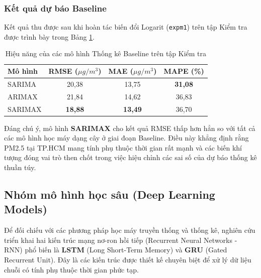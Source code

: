 \subsubsection{Kết quả dự báo Baseline}
Kết quả thu được sau khi hoàn tác biến đổi Logarit (\texttt{expm1}) trên tập Kiểm tra được trình bày trong Bảng \ref{tab:stats_baseline_metrics}.
\begin{table}[H]
    \centering
    \caption{Hiệu năng của các mô hình Thống kê Baseline trên tập Kiểm tra}
    \label{tab:stats_baseline_metrics}
    \begin{tabular}{|l|c|c|c|}
    \hline
    \textbf{Mô hình} & \textbf{RMSE ($\mu g/m^3$)} & \textbf{MAE ($\mu g/m^3$)} & \textbf{MAPE (\%)} \\ \hline
    SARIMA           & 20,38 & 13,75 & \textbf{31,08} \\ \hline
    ARIMAX           & 21,84 & 14,62 & 36,83 \\ \hline
    SARIMAX          & \textbf{18,88} & \textbf{13,49} & 36,70 \\ \hline
    \end{tabular}
\end{table}
Đáng chú ý, mô hình \textbf{SARIMAX} cho kết quả RMSE thấp hơn hẳn so với tất cả các mô hình học máy dạng cây ở giai đoạn Baseline. Điều này khẳng định rằng PM2.5 tại TP.HCM mang tính phụ thuộc thời gian rất mạnh và các biến khí tượng đóng vai trò then chốt trong việc hiệu chỉnh các sai số của dự báo thống kê thuần túy.

\subsection{Nhóm mô hình học sâu (Deep Learning Models)}
Để đối chiếu với các phương pháp học máy truyền thống và thống kê, nghiên cứu triển khai hai kiến trúc mạng nơ-ron hồi tiếp (Recurrent Neural Networks - RNN) phổ biến là \textbf{LSTM} (Long Short-Term Memory) và \textbf{GRU} (Gated Recurrent Unit). Đây là các kiến trúc được thiết kế chuyên biệt để xử lý dữ liệu chuỗi có tính phụ thuộc thời gian phức tạp.
